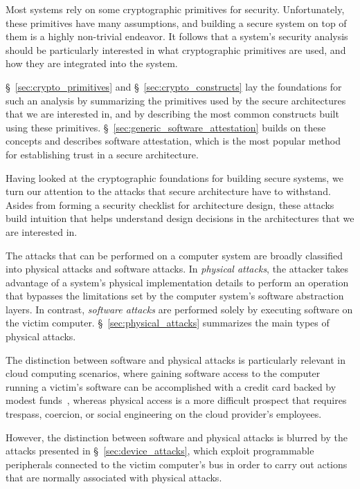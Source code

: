 \label{sec:security_background}

Most systems rely on some cryptographic primitives for security. Unfortunately,
these primitives have many assumptions, and building a secure system on top of
them is a highly non-trivial endeavor. It follows that a system's security
analysis should be particularly interested in what cryptographic primitives are
used, and how they are integrated into the system.

\S~\ref{sec:crypto_primitives} and \S~\ref{sec:crypto_constructs} lay the
foundations for such an analysis by summarizing the primitives used by the
secure architectures that we are interested in, and by describing the most
common constructs built using these primitives.
\S~\ref{sec:generic_software_attestation} builds on these concepts and
describes software attestation, which is the most popular method for
establishing trust in a secure architecture.

Having looked at the cryptographic foundations for building secure systems, we
turn our attention to the attacks that secure architecture have to withstand.
Asides from forming a security checklist for architecture design, these attacks
build intuition that helps understand design decisions in the architectures
that we are interested in.

The attacks that can be performed on a computer system are broadly classified
into physical attacks and software attacks. In \textit{physical attacks}, the
attacker takes advantage of a system's physical implementation details to
perform an operation that bypasses the limitations set by the computer
system's software abstraction layers. In contrast, \textit{software attacks}
are performed solely by executing software on the victim computer.
\S~\ref{sec:physical_attacks} summarizes the main types of physical attacks.

The distinction between software and physical attacks is particularly relevant
in cloud computing scenarios, where gaining software access to the computer
running a victim's software can be accomplished with a credit card backed by
modest funds~\cite{ristenpart2009colocation}, whereas physical access is a
more difficult prospect that requires trespass, coercion, or social engineering
on the cloud provider's employees.

However, the distinction between software and physical attacks is blurred by
the attacks presented in \S~\ref{sec:device_attacks}, which exploit
programmable peripherals connected to the victim computer's bus in order to
carry out actions that are normally associated with physical attacks.

